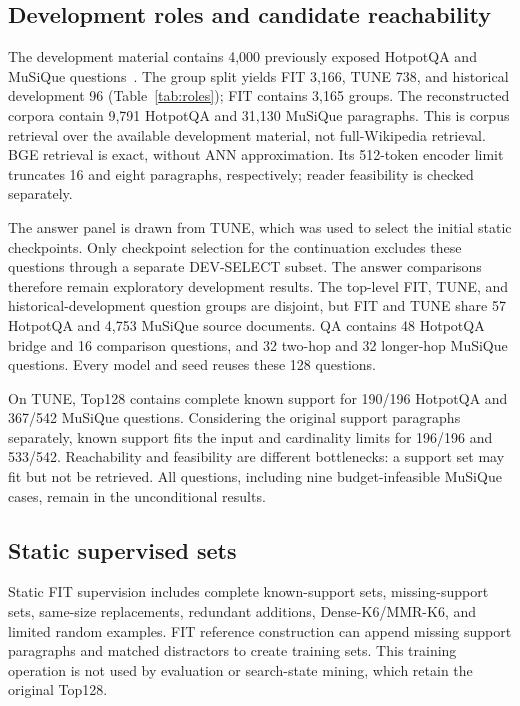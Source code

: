 \documentclass[preprint,12pt]{elsarticle}
\begin{document}
\subsection{Development roles and candidate reachability}
The development material contains 4,000 previously exposed HotpotQA and MuSiQue questions~\cite{yang2018hotpotqa,trivedi2022musique}. The group split yields FIT 3,166, TUNE 738, and historical development 96 (Table~\ref{tab:roles}); FIT contains 3,165 groups. The reconstructed corpora contain 9,791 HotpotQA and 31,130 MuSiQue paragraphs. This is corpus retrieval over the available development material, not full-Wikipedia retrieval. BGE retrieval is exact, without ANN approximation. Its 512-token encoder limit truncates 16 and eight paragraphs, respectively; reader feasibility is checked separately.



The answer panel is drawn from TUNE, which was used to select the initial static checkpoints. Only checkpoint selection for the continuation excludes these questions through a separate DEV-SELECT subset. The answer comparisons therefore remain exploratory development results. The top-level FIT, TUNE, and historical-development question groups are disjoint, but FIT and TUNE share 57 HotpotQA and 4,753 MuSiQue source documents. QA contains 48 HotpotQA bridge and 16 comparison questions, and 32 two-hop and 32 longer-hop MuSiQue questions. Every model and seed reuses these 128 questions.

On TUNE, Top128 contains complete known support for 190/196 HotpotQA and 367/542 MuSiQue questions. Considering the original support paragraphs separately, known support fits the input and cardinality limits for 196/196 and 533/542. Reachability and feasibility are different bottlenecks: a support set may fit but not be retrieved. All questions, including nine budget-infeasible MuSiQue cases, remain in the unconditional results.

\subsection{Static supervised sets}
Static FIT supervision includes complete known-support sets, missing-support sets, same-size replacements, redundant additions, Dense-K6/MMR-K6, and limited random examples. FIT reference construction can append missing support paragraphs and matched distractors to create training sets. This training operation is not used by evaluation or search-state mining, which retain the original Top128.
\end{document}
